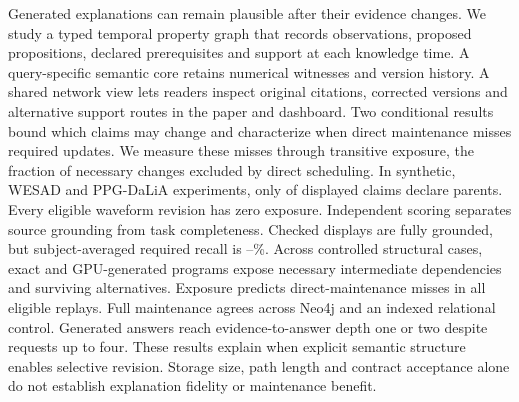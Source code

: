 Generated explanations can remain plausible after their evidence changes.
We study a typed temporal property graph that records observations, proposed
propositions, declared prerequisites and support at each knowledge time.
A query-specific semantic core retains numerical witnesses and version history.
A shared network view lets readers inspect original citations, corrected versions
and alternative support routes in the paper and dashboard. Two conditional results
bound which claims may change and characterize when direct maintenance misses
required updates. We measure these misses through transitive exposure, the fraction
of necessary changes excluded by direct scheduling. In synthetic, WESAD and
PPG-DaLiA experiments, only \SemParentClaims{} of \SemDisplayedClaims{} displayed
claims declare parents. Every eligible waveform revision has zero exposure.
Independent scoring separates source grounding from task completeness.
Checked displays are fully grounded, but subject-averaged required recall is
\SemPpgDisplayR--\SemSyntheticDisplayR\%. Across \SemCoreCases{} controlled
structural cases, exact and GPU-generated programs expose necessary intermediate
dependencies and surviving alternatives. Exposure predicts direct-maintenance
misses in all \SemPredictionGroups{} eligible replays. Full maintenance agrees
across Neo4j and an indexed relational control. Generated answers reach
evidence-to-answer depth one or two despite requests up to four.
These results explain when explicit semantic structure enables selective revision.
Storage size, path length and contract acceptance alone do not establish
explanation fidelity or maintenance benefit.
